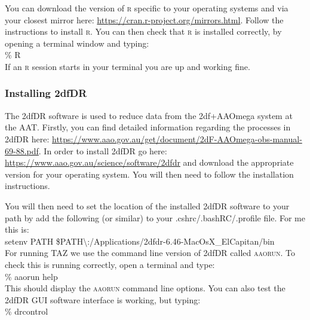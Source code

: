 \documentclass[12pt]{article}
\begin{document}
You can download the version of \textsc{r} specific to your operating systems and via your closest mirror here: \url{https://cran.r-project.org/mirrors.html}. Follow the instructions to install \textsc{r}. You can then check that \textsc{r} is installed correctly, by opening a terminal window and typing: \\


\hspace{10mm} \% R\\

If an \textsc{r} session starts in your terminal you are up and working fine.

\subsubsection{Installing 2dfDR}

The 2dfDR software is used to reduce data from the 2df+AAOmega system at the AAT. Firstly, you can find detailed information regarding the processes in 2dfDR here:  \url{https://www.aao.gov.au/get/document/2dF-AAOmega-obs-manual-69-88.pdf}. In order to install 2dfDR go here: \url{https://www.aao.gov.au/science/software/2dfdr} and download the appropriate version for your operating system. You will then need to follow the installation instructions.

You will then need to set the location of the installed 2dfDR software to your path by add the following (or similar) to your .cshrc/.bashRC/.profile file. For me this is: \\


\hspace{10mm} setenv PATH \$PATH\textbackslash:/Applications/2dfdr-6.46-MacOsX\_ElCapitan/bin \\

For running \textsc{TAZ} we use the command line version of 2dfDR called \textsc{aaorun}. To check this is running correctly, open a terminal and type: \\

\hspace{10mm} \% aaorun help\\

This should display the  \textsc{aaorun} command line options. You can also test the 2dfDR GUI software interface is working, but typing: \\

 
\hspace{10mm} \% drcontrol\\
\end{document}
